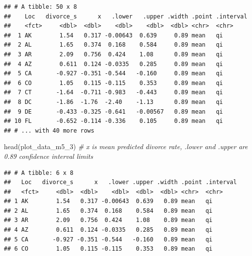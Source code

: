 \documentclass[
]{book}
\newenvironment{Shaded}{\begin{snugshade}}{\end{snugshade}}
\newcommand{\CommentTok}[1]{\textcolor[rgb]{0.56,0.35,0.01}{\textit{#1}}}
\newcommand{\FunctionTok}[1]{\textcolor[rgb]{0.00,0.00,0.00}{#1}}
\newcommand{\NormalTok}[1]{#1}
\begin{document}
\begin{verbatim}
## # A tibble: 50 x 8
##    Loc   divorce_s      x   .lower   .upper .width .point .interval
##    <fct>     <dbl>  <dbl>    <dbl>    <dbl>  <dbl> <chr>  <chr>    
##  1 AK        1.54   0.317 -0.00643  0.639     0.89 mean   qi       
##  2 AL        1.65   0.374  0.168    0.584     0.89 mean   qi       
##  3 AR        2.09   0.756  0.424    1.08      0.89 mean   qi       
##  4 AZ        0.611  0.124 -0.0335   0.285     0.89 mean   qi       
##  5 CA       -0.927 -0.351 -0.544   -0.160     0.89 mean   qi       
##  6 CO        1.05   0.115 -0.115    0.353     0.89 mean   qi       
##  7 CT       -1.64  -0.711 -0.983   -0.443     0.89 mean   qi       
##  8 DC       -1.86  -1.76  -2.40    -1.13      0.89 mean   qi       
##  9 DE       -0.433 -0.325 -0.641   -0.00567   0.89 mean   qi       
## 10 FL       -0.652 -0.114 -0.336    0.105     0.89 mean   qi       
## # ... with 40 more rows
\end{verbatim}

\begin{Shaded}
\begin{Highlighting}[]
\FunctionTok{head}\NormalTok{(plot\_data\_m5\_3) }\CommentTok{\# x is mean predicted divorce rate, .lower and .upper are 0.89 confidence interval limits}
\end{Highlighting}
\end{Shaded}

\begin{verbatim}
## # A tibble: 6 x 8
##   Loc   divorce_s      x   .lower .upper .width .point .interval
##   <fct>     <dbl>  <dbl>    <dbl>  <dbl>  <dbl> <chr>  <chr>    
## 1 AK        1.54   0.317 -0.00643  0.639   0.89 mean   qi       
## 2 AL        1.65   0.374  0.168    0.584   0.89 mean   qi       
## 3 AR        2.09   0.756  0.424    1.08    0.89 mean   qi       
## 4 AZ        0.611  0.124 -0.0335   0.285   0.89 mean   qi       
## 5 CA       -0.927 -0.351 -0.544   -0.160   0.89 mean   qi       
## 6 CO        1.05   0.115 -0.115    0.353   0.89 mean   qi
\end{verbatim}
\end{document}
